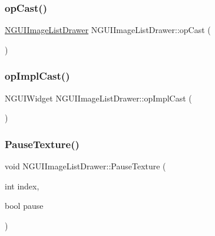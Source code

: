 \hypertarget{class_n_g_u_i_image_list_drawer_a827f0eb20fd019e6804b052538172275}{}\label{class_n_g_u_i_image_list_drawer_a827f0eb20fd019e6804b052538172275} 
\subsubsection{\texorpdfstring{op\+Cast()}{opCast()}}
{\footnotesize\ttfamily \hyperlink{class_n_g_u_i_image_list_drawer}{N\+G\+U\+I\+Image\+List\+Drawer} N\+G\+U\+I\+Image\+List\+Drawer\+::op\+Cast (\begin{DoxyParamCaption}{ }\end{DoxyParamCaption})}

\hypertarget{class_n_g_u_i_image_list_drawer_a792e61b468f61db72b1535e2feb4c2a2}{}\label{class_n_g_u_i_image_list_drawer_a792e61b468f61db72b1535e2feb4c2a2} 
\subsubsection{\texorpdfstring{op\+Impl\+Cast()}{opImplCast()}}
{\footnotesize\ttfamily N\+G\+U\+I\+Widget N\+G\+U\+I\+Image\+List\+Drawer\+::op\+Impl\+Cast (\begin{DoxyParamCaption}{ }\end{DoxyParamCaption})}

\hypertarget{class_n_g_u_i_image_list_drawer_ab364ea546b7aeeb74480bb04015d8937}{}\label{class_n_g_u_i_image_list_drawer_ab364ea546b7aeeb74480bb04015d8937} 
\subsubsection{\texorpdfstring{Pause\+Texture()}{PauseTexture()}}
{\footnotesize\ttfamily void N\+G\+U\+I\+Image\+List\+Drawer\+::\+Pause\+Texture (\begin{DoxyParamCaption}\item[{int}]{index,  }\item[{bool}]{pause }\end{DoxyParamCaption})}

